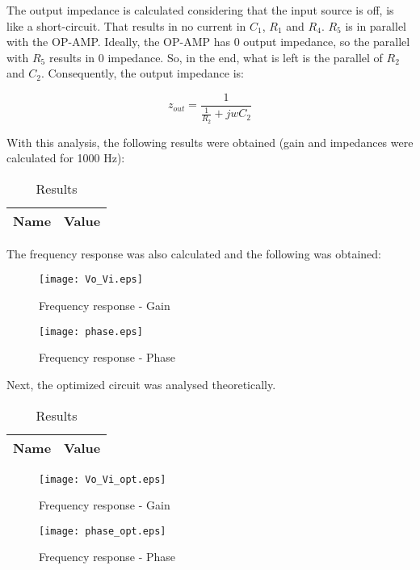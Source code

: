 The output impedance is calculated considering that the input source is off, is like a short-circuit. That results in no current in $C_1$, $R_1$ and $R_4$. $R_5$ is in parallel with the OP-AMP. Ideally, the OP-AMP has 0 output impedance, so the parallel with $R_5$ results in 0 impedance. So, in the end, what is left is the parallel of $R_2$ and $C_2$. Consequently, the output impedance is:

\begin{equation}
        z_{out} = \frac{1}{\frac{1}{R_2}+jwC_2}
\end{equation}

With this analysis, the following results were obtained (gain and impedances were calculated for 1000 Hz):

\begin{table}[H]
  \centering
  \begin{tabular}{|c|c|}
    \hline
        {\bf Name} & {\bf Value} \\
        \hline
        \hline
        
        \hline
  \end{tabular}
  \caption{Results}
  \label{teo_results}
\end{table}

The frequency response was also calculated and the following was obtained:

\begin{figure}[H]
        \centering
        \texttt{[image: Vo\_Vi.eps]}
        \caption{Frequency response - Gain}
        \label{tfrg}
\end{figure}

\begin{figure}[H]
        \centering
        \texttt{[image: phase.eps]}
        \caption{Frequency response - Phase}
        \label{tfrf}
\end{figure}


Next, the optimized circuit was analysed theoretically.

\begin{table}[H]
  \centering
  \begin{tabular}{|c|c|}
    \hline
        {\bf Name} & {\bf Value} \\
        \hline
        \hline
        
        \hline
  \end{tabular}
  \caption{Results}
  \label{teo_results}
\end{table}

\begin{figure}[H]
        \centering
        \texttt{[image: Vo\_Vi\_opt.eps]}
        \caption{Frequency response - Gain}
        \label{tfrg}
\end{figure}

\begin{figure}[H]
        \centering
        \texttt{[image: phase\_opt.eps]}
        \caption{Frequency response - Phase}
        \label{tfrf}
\end{figure}
